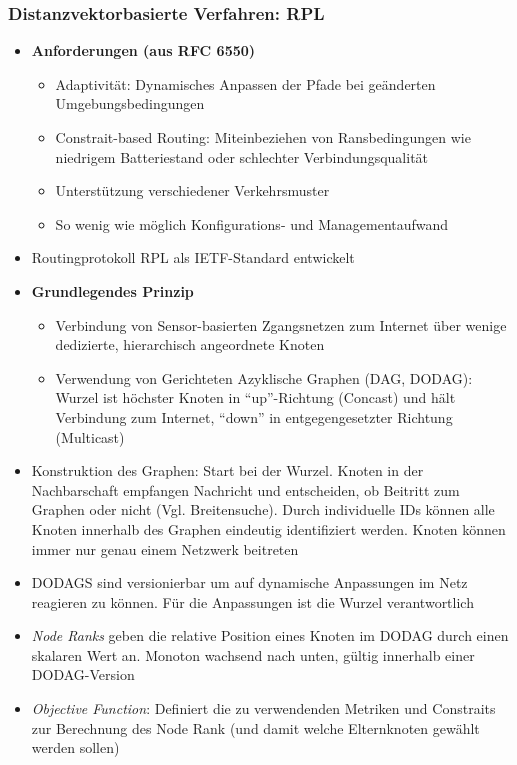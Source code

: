 \subsubsection{Distanzvektorbasierte Verfahren: RPL}
\begin{itemize}
	\item \textbf{Anforderungen (aus RFC 6550)}
	\begin{itemize}
		\item Adaptivität: Dynamisches Anpassen der Pfade bei geänderten Umgebungsbedingungen
		\item Constrait-based Routing: Miteinbeziehen von Ransbedingungen wie niedrigem Batteriestand oder schlechter Verbindungsqualität
		\item Unterstützung verschiedener Verkehrsmuster
		\item So wenig wie möglich Konfigurations- und Managementaufwand
	\end{itemize}
	\item Routingprotokoll RPL als IETF-Standard entwickelt
	\item \textbf{Grundlegendes Prinzip}
	\begin{itemize}
		\item Verbindung von Sensor-basierten Zgangsnetzen zum Internet über wenige dedizierte, hierarchisch angeordnete Knoten
		\item Verwendung von Gerichteten Azyklische Graphen (DAG, DODAG): Wurzel ist höchster Knoten in "`up"'-Richtung (Concast) und hält Verbindung zum Internet, "`down"' in entgegengesetzter Richtung (Multicast)
	\end{itemize}
	\item Konstruktion des Graphen: Start bei der Wurzel. Knoten in der Nachbarschaft empfangen Nachricht und entscheiden, ob Beitritt zum Graphen oder nicht (Vgl. Breitensuche). Durch individuelle IDs können alle Knoten innerhalb des Graphen eindeutig identifiziert werden. Knoten können immer nur genau einem Netzwerk beitreten
	\item DODAGS sind versionierbar um auf dynamische Anpassungen im Netz reagieren zu können. Für die Anpassungen ist die Wurzel verantwortlich
	\item \textit{Node Ranks} geben die relative Position eines Knoten im DODAG durch einen skalaren Wert an. Monoton wachsend nach unten, gültig innerhalb einer DODAG-Version
	\item \textit{Objective Function}: Definiert die zu verwendenden Metriken und Constraits zur Berechnung des Node Rank (und damit welche Elternknoten gewählt werden sollen)

\end{itemize}
